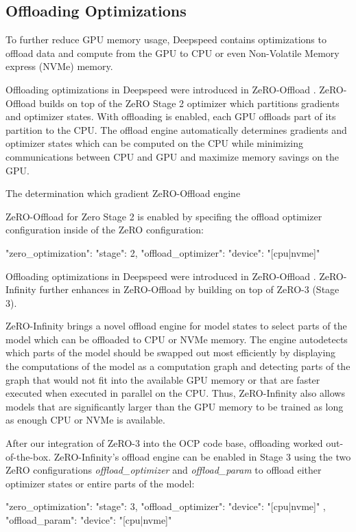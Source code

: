 \subsection{Offloading Optimizations}

To further reduce GPU memory usage, Deepspeed contains optimizations to offload 
data and compute from the GPU to CPU or even Non-Volatile Memory express (NVMe) 
memory. 

Offloading optimizations in Deepspeed were introduced in ZeRO-Offload 
\cite*{DBLP:journals/corr/abs-2101-06840}. ZeRO-Offload builds on top of 
the ZeRO Stage 2 optimizer which partitions gradients and optimizer states. 
With offloading is enabled, each GPU offloads part of its partition to the CPU. 
The offload engine automatically determines gradients and optimizer states 
which can be computed on the CPU while minimizing communications between CPU 
and GPU and maximize memory savings on the GPU.

The determination which gradient ZeRO-Offload engine 

ZeRO-Offload for Zero Stage 2 is enabled by specifing the offload optimizer 
configuration inside of the ZeRO configuration:

\begin{json}
{
    "zero_optimization": {
        "stage": 2,
        "offload_optimizer": {
            "device": "[cpu|nvme]"
        }
    }
}
\end{json}

Offloading optimizations in Deepspeed were introduced in ZeRO-Offload 
\cite*{DBLP:journals/corr/abs-2101-06840}. ZeRO-Infinity 
\cite*{DBLP:journals/corr/abs-2104-07857}
further enhances in ZeRO-Offload by building on top of ZeRO-3 (Stage 3).

ZeRO-Infinity brings a novel offload engine for model states to select 
parts of the model which can be offloaded to CPU or NVMe memory. 
The engine autodetects which parts of the model should be swapped out most 
efficiently by displaying the computations of the model as a computation 
graph and detecting parts of the graph that would not fit into the available 
GPU memory or that are faster executed when executed in parallel on the CPU. 
Thus, ZeRO-Infinity also allows models that are significantly larger than 
the GPU memory to be trained as long as enough CPU or NVMe is available. 

After our integration of ZeRO-3 into the OCP code base, offloading worked 
out-of-the-box. ZeRO-Infinity's offload engine can be enabled in Stage 3 
using the two ZeRO configurations \textit{offload\_optimizer} and 
\textit{offload\_param} to offload either optimizer states or entire 
parts of the model:

\begin{json}
{
    "zero_optimization": {
        "stage": 3,
        "offload_optimizer": {
            "device": "[cpu|nvme]"
        },
        "offload_param": {
            "device": "[cpu|nvme]"
        }
    }
}
\end{json}